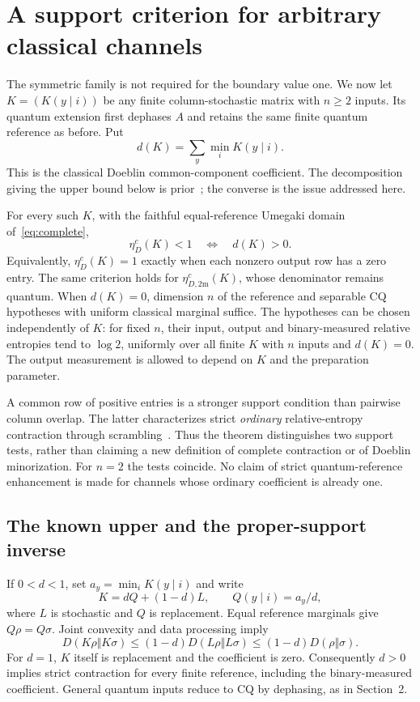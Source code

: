 \section{A support criterion for arbitrary classical channels}\label{sec:support}
The symmetric family is not required for the boundary value one. We now let $K=(K(y\mid i))$ be any finite column-stochastic matrix with $n\geq2$ inputs. Its quantum extension first dephases $A$ and retains the same finite quantum reference as before. Put
\[
 d(K)=\sum_y\min_i K(y\mid i).
\]
This is the classical Doeblin common-component coefficient. The decomposition giving the upper bound below is prior~\cite{GHNW,HGNW}; the converse is the issue addressed here.

\begin{theorem}\label{thm:support}
For every such $K$, with the faithful equal-reference Umegaki domain of~\eqref{eq:complete},
\[
 \eta_D^c(K)<1\quad\Longleftrightarrow\quad d(K)>0.
\]
Equivalently, $\eta_D^c(K)=1$ exactly when each nonzero output row has a zero entry. The same criterion holds for $\eta_{D,2\mathrm m}^c(K)$, whose denominator remains quantum. When $d(K)=0$, dimension $n$ of the reference and separable CQ hypotheses with uniform classical marginal suffice. The hypotheses can be chosen independently of $K$: for fixed $n$, their input, output and binary-measured relative entropies tend to $\log2$, uniformly over all finite $K$ with $n$ inputs and $d(K)=0$. The output measurement is allowed to depend on $K$ and the preparation parameter.
\end{theorem}

A common row of positive entries is a stronger support condition than pairwise column overlap. The latter characterizes strict \emph{ordinary} relative-entropy contraction through scrambling~\cite[Theorems~4.1--4.2]{Cohen}. Thus the theorem distinguishes two support tests, rather than claiming a new definition of complete contraction or of Doeblin minorization. For $n=2$ the tests coincide. No claim of strict quantum-reference enhancement is made for channels whose ordinary coefficient is already one.

\subsection{The known upper and the proper-support inverse}
If $0<d<1$, set $a_y=\min_iK(y\mid i)$ and write
\[
 K=dQ+(1-d)L,\qquad Q(y\mid i)=a_y/d,
\]
where $L$ is stochastic and $Q$ is replacement. Equal reference marginals give $Q\rho=Q\sigma$. Joint convexity and data processing imply
\begin{equation}\label{eq:doeblin-upper}
 D(K\rho\Vert K\sigma)\leq(1-d)D(L\rho\Vert L\sigma)
 \leq(1-d)D(\rho\Vert\sigma).
\end{equation}
For $d=1$, $K$ itself is replacement and the coefficient is zero. Consequently $d>0$ implies strict contraction for every finite reference, including the binary-measured coefficient. General quantum inputs reduce to CQ by dephasing, as in Section~2.

